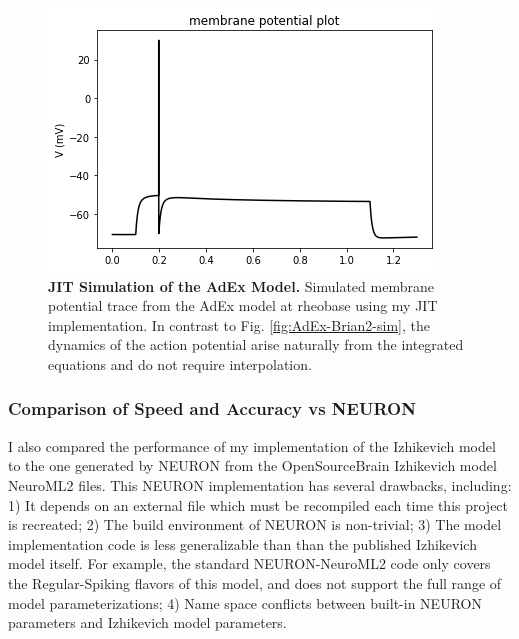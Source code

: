 \begin{figure}[!htb]
\begin{center}
\includegraphics[scale=0.7]{figures/backend_check_files/backend_check_4_2.png}
\caption[JIT Simulation of the AdEx Model]{\textbf{JIT Simulation of the AdEx Model.} Simulated membrane potential trace from the AdEx model at rheobase using my JIT implementation. In contrast to Fig. \ref{fig:AdEx-Brian2-sim}, the dynamics of the action potential arise naturally from the integrated equations and do not require interpolation.}
\label{fig:AdEx-JIT-sim}
\end{center}
\end{figure}

\subsubsection{Comparison of Speed and Accuracy vs NEURON}
I also compared the performance of my implementation of the Izhikevich model to the one generated by NEURON from the OpenSourceBrain Izhikevich model NeuroML2 files.
This NEURON implementation has several drawbacks, including: 1) It depends on an external file which must be recompiled each time this project is recreated; 2) The build environment of NEURON is non-trivial; 3) The model implementation code is less generalizable than than the published Izhikevich model itself.
For example, the standard NEURON-NeuroML2 code only covers the Regular-Spiking flavors of this model, and does not support the full range of model parameterizations; 4) Name space conflicts between built-in NEURON parameters and Izhikevich model parameters.  



